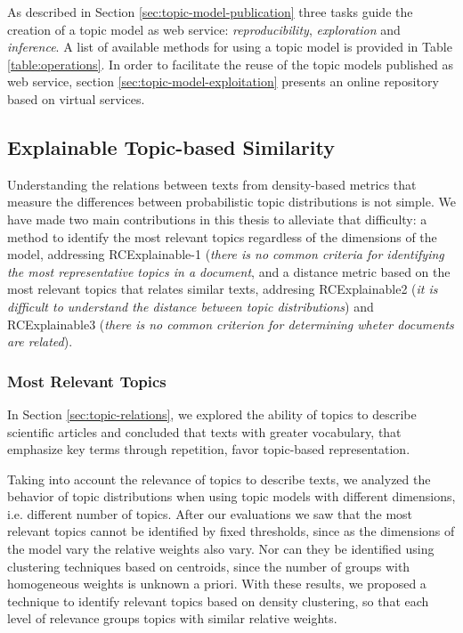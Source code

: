 As described in Section \ref{sec:topic-model-publication} three tasks guide the creation of a topic model as web service: \textit{reproducibility}, \textit{exploration} and \textit{inference}. A list of available methods for using a topic model is provided in Table \ref{table:operations}. In order to facilitate the reuse of the topic models published as web service, section \ref{sec:topic-model-exploitation} presents an online repository based on virtual services.

\subsection{Explainable Topic-based Similarity}

Understanding the relations between texts from density-based metrics that measure the differences between probabilistic topic distributions is not simple. We have made two main contributions in this thesis to alleviate that difficulty: a method to identify the most relevant topics regardless of the dimensions of the model, addressing RCExplainable-1 (\textit{there is no common criteria for identifying the most representative topics in a document}, and a distance metric based on the most relevant topics that relates similar texts, addresing RCExplainable2 (\textit{it is difficult to understand the distance between topic distributions}) and RCExplainable3 (\textit{there is no common criterion for determining wheter documents are related}).

\subsubsection{Most Relevant Topics}

In Section \ref{sec:topic-relations}, we explored the ability of topics to describe scientific articles and concluded that texts with greater vocabulary, that emphasize key terms through repetition, favor topic-based representation. 

Taking into account the relevance of topics to describe texts, we analyzed the behavior of topic distributions when using topic models with different dimensions, i.e. different number of topics. After our evaluations we saw that the most relevant topics cannot be identified by fixed thresholds, since as the dimensions of the model vary the relative weights also vary. Nor can they be identified using clustering techniques based on centroids, since the number of groups with homogeneous weights is unknown a priori. With these results, we proposed a technique to identify relevant topics based on density clustering, so that each level of relevance groups topics with similar relative weights.

